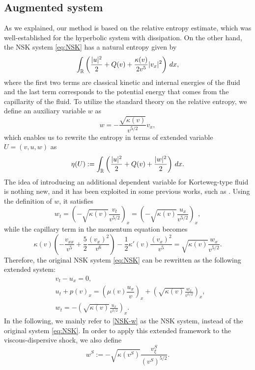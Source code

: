\documentclass[11pt,reqno]{amsart}
\begin{document}
\subsection{Augmented system}
    As we explained, our method is based on the relative entropy estimate, which was well-established for the hyperbolic system with dissipation. On the other hand, the NSK system \eqref{eq:NSK} has a natural entropy given by
    \[\int_{\mathbb{R}} \left(\frac{|u|^2}{2}+ Q(v) + \frac{\kappa(v)}{2v^5}|v_x|^2\right)\,dx,\]
    where the first two terms are classical kinetic and internal energies of the fluid and the last term corresponds to the potential energy that comes from the capillarity of the fluid. To utilize the standard theory on the relative entropy, we define an auxiliary variable $w$ as
    \[w=- \dfrac{\sqrt{\kappa(v)} }{v^{5/2}} v_x,\]
    which enables us to rewrite the entropy in terms of extended variable $U=(v,u,w)$ as
    \begin{equation}\label{entropy}
    \eta(U):=\int_{\mathbb{R}} \left(\frac{|u|^2}{2}+Q(v)+\frac{|w|^2}{2 }\right)\,dx.
    \end{equation}
    The idea of introducing an additional dependent variable for Korteweg-type fluid is nothing new, and it has been exploited in some previous works, such as \cite{BDD06, BDD07}. Using the definition of $w$, it satisfies 
    \[w_t=\left( -\sqrt{\kappa(v)}\dfrac{v_t }{v^{5/2}}  \right)_x=\left( -\sqrt{\kappa(v)}\dfrac{u_x }{v^{5/2}} \right)_x,\]
    while the capillary term in the momentum equation becomes
    \[\kappa(v) \left( - \dfrac{v_{xx}}{v^5} + \dfrac{5}{2} \dfrac{(v_x)^2}{v^6} \right)-\dfrac{1}{2} \kappa'(v) \dfrac{(v_x)^2}{v^5}=\sqrt{\kappa(v)}\frac{w_x}{v^{5/2}}.\]
    Therefore, the original NSK system \eqref{eq:NSK} can be rewritten as the following extended system:
    \begin{equation}\label{NSK-w}
    \begin{aligned}
        &v_t-u_x=0, \\
        &u_t+p(v)_x=\left(\mu(v) \dfrac{u_x}{v} \right)_x + \left( \sqrt{\kappa(v)}\frac{w_x}{v^{5/2}} \right)_x, \\
        &w_t=-\left( \sqrt{\kappa(v)}\frac{u_x}{v^{5/2}}\right)_x.
    \end{aligned}
    \end{equation}
    In the following, we mainly refer to \eqref{NSK-w} as the NSK system, instead of the original system \eqref{eq:NSK}. In order to apply this extended framework to the viscous-dispersive shock, we also define
   	\[w^S:=-\sqrt{\kappa(v^S)}\frac{v^S_\xi}{(v^S)^{5/2}}.\]
\end{document}
